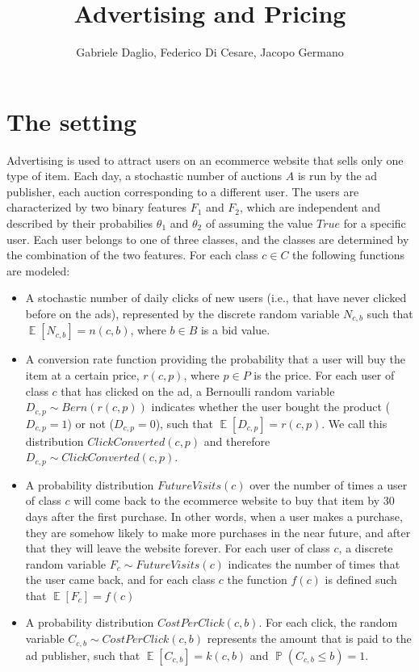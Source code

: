 \documentclass[11pt]{article} %
\title{Advertising and Pricing}
\author{Gabriele Daglio, Federico Di Cesare, Jacopo Germano}
\DeclareMathOperator{\EX}{\mathbb{E}}
\DeclareMathOperator{\Prob}{\mathbb{P}}
\begin{document}
\maketitle

\section{The setting}

Advertising is used to attract users on an ecommerce website that sells only one type of item. Each day, a stochastic number of auctions $A$ is run by the ad publisher, each auction corresponding to a different user. The users are characterized by two binary features $F_1$ and $F_2$, which are independent and described by their probabilies $\theta_1$ and $\theta_2$ of assuming the value $True$ for a specific user.
Each user belongs to one of three classes, and the classes are determined by the combination of the two features. 
For each class $c \in C$ the following functions are modeled:
\begin{itemize}
\item A stochastic number of daily clicks of new users (i.e., that have never clicked before on the ads), represented by the discrete random variable $N_{c,b}$ such that $\EX[N_{c,b}] = n(c,b)$, where $b \in B$ is a bid value.
\item A conversion rate function providing the probability that a user will buy the item at a certain price,  $r(c,p)$, where $p \in P$ is the price. For each user of class $c$ that has clicked on the ad, a Bernoulli random variable $D_{c,p} \sim Bern(r(c,p))$ indicates whether the user bought the product ($D_{c,p}=1$) or not ($D_{c,p}=0$), such that $\EX[D_{c,p}]=r(c,p)$. We call this distribution $ClickConverted(c,p)$ and therefore $D_{c,p} \sim ClickConverted(c,p)$.
\item A probability distribution $FutureVisits(c)$ over the number of times a user of class $c$ will come back to the ecommerce website to buy that item by 30 days after the first purchase. In other words, when a user makes a purchase, they are somehow likely to make more purchases in the near future, and after that they will leave the website forever. For each user of class $c$, a discrete random variable $F_c \sim FutureVisits(c)$ indicates the number of times that the user came back, and for each class $c$ the function $f(c)$ is defined such that $\EX[F_c] = f(c)$
\item A probability distribution $CostPerClick(c,b)$. For each click, the random variable $C_{c,b}\sim CostPerClick(c,b)$ represents the amount that is paid to the ad publisher, such that $\EX[C_{c,b}] = k(c,b)$ and $\Prob(C_{c,b} \leq b) = 1$.
\end{itemize}
\end{document}
